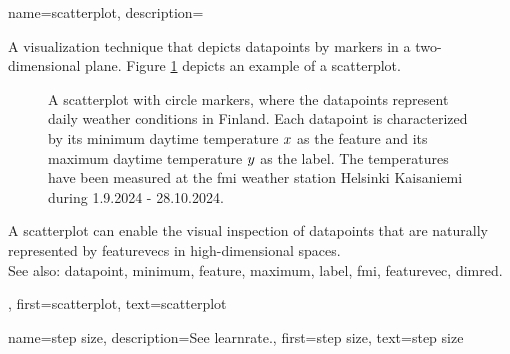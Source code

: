 {name={scatterplot}, 
	description={A 
		visualization technique that depicts \glspl{datapoint} by markers in a two-dimensional plane. 
		Figure \ref{fig_scatterplot_temp_FMI_dict} depicts an example of a scatterplot.  
		\begin{figure}[H]
			\begin{center}
				\vspace*{-10mm}
			\end{center}
			\caption{A scatterplot with circle markers, where the \glspl{datapoint} represent daily weather conditions in Finland. 
				Each \gls{datapoint} is characterized by its \gls{minimum} daytime temperature $x$ 
				as the \gls{feature} and its \gls{maximum} daytime temperature $y$ as the \gls{label}. 
				The temperatures have been measured at the \gls{fmi} weather station Helsinki Kaisaniemi 
				during 1.9.2024 - 28.10.2024.}
			\label{fig_scatterplot_temp_FMI_dict}
			\vspace*{-3mm}
			\end{figure}
		A scatterplot can enable the visual inspection of \glspl{datapoint} that are naturally 
		represented by \glspl{featurevec} in high-dimensional spaces.
		\\
		See also: \gls{datapoint}, \gls{minimum}, \gls{feature}, \gls{maximum}, \gls{label}, \gls{fmi}, \gls{featurevec}, \gls{dimred}.},
	first={scatterplot},
	text={scatterplot} 
}


{name={step size}, 
	description={See \gls{learnrate}.}, 
	first={step size},
	text={step size} 
}

